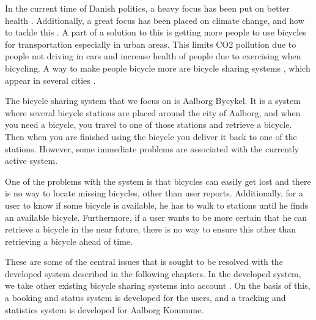 	
	

In the current time of Danish politics, a heavy focus has been put on better health \citep{misc:nationalemaalhelbred}.
Additionally, a great focus has been placed on climate change, and how to tackle this \citep{misc:klima}.
A part of a solution to this is getting more people to use bicycles for transportation especially in urban areas.
This limits CO2 pollution due to people not driving in cars and increase health of people due to exercising when bicycling.
A way to make people bicycle more are bicycle sharing systems \citep{misc:impactofbikeshare}, which appear in several cities \citep{misc:cibi, misc:bycyklen, misc:AltaBicycleShare, misc:aalborgbycykelMain}.

The bicycle sharing system that we focus on is Aalborg Bycykel.
It is a system where several bicycle stations are placed around the city of Aalborg, and when you need a bicycle, you travel to one of those stations and retrieve a bicycle.
Then when you are finished using the bicycle you deliver it back to one of the stations.
However, some immediate problems are associated with the currently active system.

One of the problems with the system is that bicycles can easily get lost and there is no way to locate missing bicycles, other than user reports.
Additionally, for a user to know if some bicycle is available, he has to walk to stations until he finds an available bicycle.
Furthermore, if a user wants to be more certain that he can retrieve a bicycle in the near future, there is no way to ensure this other than retrieving a bicycle ahead of time.

These are some of the central issues that is sought to be resolved with the developed system described in the following chapters.
In the developed system, we take other existing bicycle sharing systems into account \citep{misc:cibi, misc:bycyklen, misc:AltaBicycleShare}.
On the basis of this, a booking and status system is developed for the users, and a tracking and statistics system is developed for Aalborg Kommune.

